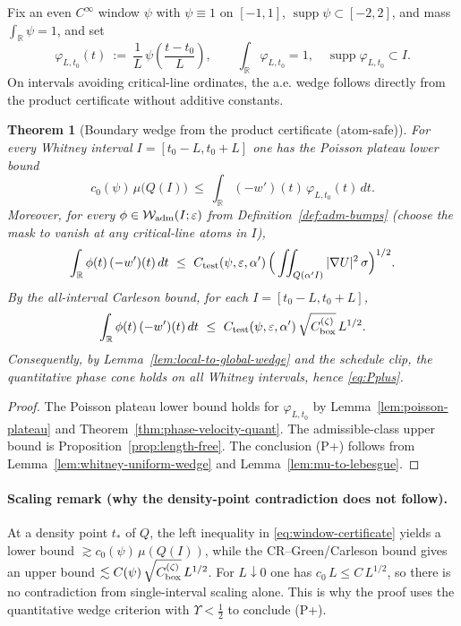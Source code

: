 \documentclass[11pt]{article}
\newtheorem{theorem}{Theorem}
\theoremstyle{definition}
\theoremstyle{remark}
\newcommand{\R}{\mathbb{R}}
\begin{document}
Fix an even $C^\infty$ window $\psi$ with $\psi\equiv 1$ on $[-1,1]$, $\operatorname{supp}\psi\subset[-2,2]$, and mass $\int_\R\psi=1$, and set
\[
  \varphi_{L,t_0}(t)\ :=\ \frac{1}{L}\,\psi\!\left(\frac{t-t_0}{L}\right),\qquad \int_{\R}\!\varphi_{L,t_0}=1,\quad \operatorname{supp}\varphi_{L,t_0}\subset I.
\]
On intervals avoiding critical-line ordinates, the a.e. wedge follows directly from the product certificate without additive constants.
\begin{theorem}[Boundary wedge from the product certificate (atom-safe)]\label{thm:psc-certificate-stage2}
For every Whitney interval $I=[t_0-L,t_0+L]$ one has the Poisson plateau lower bound
\[
  c_0(\psi)\,\mu\!\big(Q(I)\big)\ \le\ \int_{\R} (-w')(t)\,\varphi_{L,t_0}(t)\,dt.
\]
Moreover, for every $\phi\in\mathcal W_{\rm adm}(I;\varepsilon)$ from Definition~\ref{def:adm-bumps} (choose the mask to vanish at any critical-line atoms in $I$),
\[
  \int_{\R} \phi(t)\,(-w')(t)\,dt\ \le\ C_{\rm test}(\psi,\varepsilon,\alpha')\,\Big(\iint_{Q(\alpha'I)} |\nabla U|^2\,\sigma\Big)^{1/2}.
\]
By the all-interval Carleson bound, for each $I=[t_0-L,t_0+L]$,
\[
  \int_{\R} \phi(t)\,(-w')(t)\,dt\ \le\ C_{\rm test}(\psi,\varepsilon,\alpha')\,\sqrt{C_{\rm box}^{(\zeta)}}\,L^{1/2}.
\]
Consequently, by Lemma~\ref{lem:local-to-global-wedge} and the schedule clip, the quantitative phase cone holds on all Whitney intervals, hence \eqref{eq:Pplus}.
\end{theorem}
\begin{proof}
The Poisson plateau lower bound holds for $\varphi_{L,t_0}$ by Lemma~\ref{lem:poisson-plateau} and Theorem~\ref{thm:phase-velocity-quant}. The admissible-class upper bound is Proposition~\ref{prop:length-free}. The conclusion \textup{(P+)} follows from Lemma~\ref{lem:whitney-uniform-wedge} and Lemma~\ref{lem:mu-to-lebesgue}.
\end{proof}

\paragraph{Scaling remark (why the density-point contradiction does not follow).}
At a density point $t_*$ of $Q$, the left inequality in \eqref{eq:window-certificate} yields a lower bound $\gtrsim c_0(\psi)\,\mu(Q(I))$, while the CR–Green/Carleson bound gives an upper bound $\lesssim C(\psi)\,\sqrt{C_{\rm box}^{(\zeta)}}\,L^{1/2}$. For $L\downarrow 0$ one has $c_0\,L\le C\,L^{1/2}$, so there is no contradiction from single-interval scaling alone. This is why the proof uses the quantitative wedge criterion with $\Upsilon<\tfrac12$ to conclude (P+).
\end{document}
